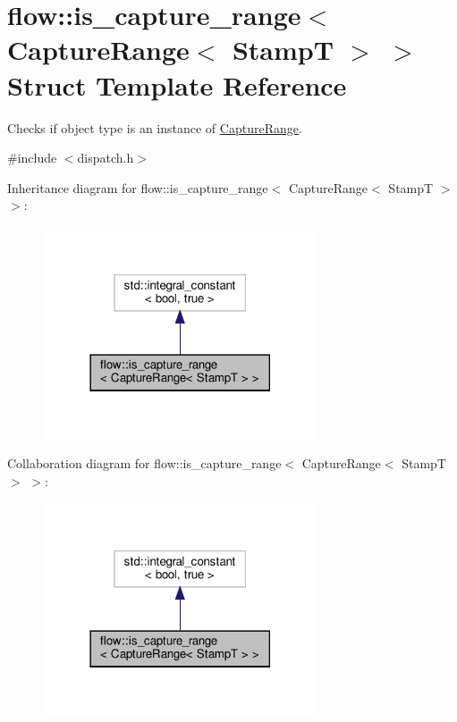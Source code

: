 \hypertarget{structflow_1_1is__capture__range_3_01_capture_range_3_01_stamp_t_01_4_01_4}{}\section{flow\+:\+:is\+\_\+capture\+\_\+range$<$ Capture\+Range$<$ StampT $>$ $>$ Struct Template Reference}
\label{structflow_1_1is__capture__range_3_01_capture_range_3_01_stamp_t_01_4_01_4}


Checks if object type is an instance of \hyperlink{structflow_1_1_capture_range}{Capture\+Range}.  




{\ttfamily \#include $<$dispatch.\+h$>$}



Inheritance diagram for flow\+:\+:is\+\_\+capture\+\_\+range$<$ Capture\+Range$<$ StampT $>$ $>$\+:
\nopagebreak
\begin{figure}[H]
\begin{center}
\leavevmode
\includegraphics[width=230pt]{structflow_1_1is__capture__range_3_01_capture_range_3_01_stamp_t_01_4_01_4__inherit__graph}
\end{center}
\end{figure}


Collaboration diagram for flow\+:\+:is\+\_\+capture\+\_\+range$<$ Capture\+Range$<$ StampT $>$ $>$\+:
\nopagebreak
\begin{figure}[H]
\begin{center}
\leavevmode
\includegraphics[width=230pt]{structflow_1_1is__capture__range_3_01_capture_range_3_01_stamp_t_01_4_01_4__coll__graph}
\end{center}
\end{figure}


